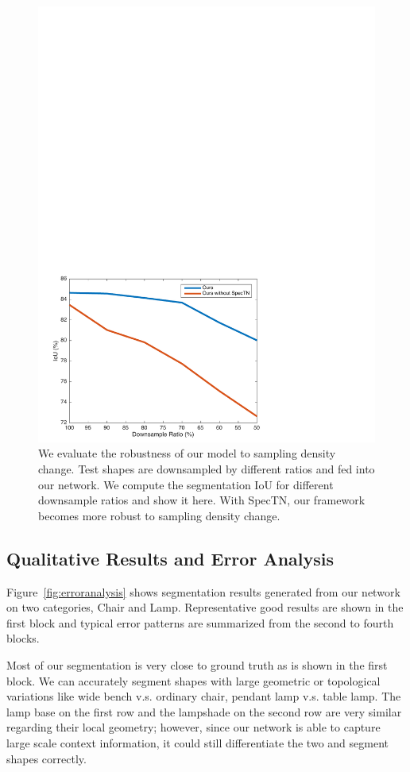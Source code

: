 \begin{figure}
 \centering
 \includegraphics[width=0.8\linewidth]{./fig/downsample.pdf}
 \caption{We evaluate the robustness of our model to sampling density change. Test shapes are downsampled by different ratios and fed into our network. We compute the segmentation IoU for different downsample ratios and show it here. With SpecTN, our framework becomes more robust to sampling density change.}
 \label{fig:downsample}
\end{figure}


\subsection{Qualitative Results and Error Analysis}
Figure~\ref{fig:erroranalysis} shows segmentation results generated from our network on two categories, Chair and Lamp. Representative good results are shown in the first block and  typical error patterns are summarized from the second to fourth blocks.

Most of our segmentation is very close to ground truth as is shown in the first block. We can accurately segment shapes with large geometric or topological variations like wide bench v.s. ordinary chair, pendant lamp v.s. table lamp. The lamp base on the first row and the lampshade on the second row are very similar regarding their local geometry; however, since our network is able to capture large scale context information, it could still differentiate the two and segment shapes correctly.

